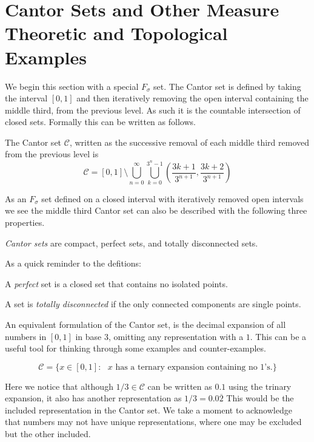 \section{Cantor Sets and Other Measure Theoretic and Topological Examples}
We begin this section with a special $F_\sigma$ set.  The Cantor set is defined by taking the interval $[0,1]$ and then iteratively removing the open interval containing the middle third, from the previous level.  As such it is the countable intersection of closed sets.  Formally this can be written as follows.
\begin{definition}
    The Cantor set $\mathcal{C}$, written as the successive removal of each middle third removed from the previous level is 
    $$\mathcal{C} = [0,1] \setminus \bigcup_{n=0}^\infty\bigcup_{k=0}^{3^n-1}\left(\frac{3k+1}{3^{n+1}},\frac{3k+2}{3^{n+1}}\right)$$
\end{definition}

As an $F_\sigma$ set defined on a closed interval with iteratively removed open intervals we see the middle third Cantor set can also be described with the following three properties.
\begin{definition}
    \textit{Cantor sets} are compact, perfect sets, and totally disconnected sets.      
\end{definition}

As a quick reminder to the defitions:
\begin{definition}[Perfect]
    A \textit{perfect} set is a closed set that contains no isolated points.
\end{definition}
\begin{definition}
    A set is \textit{totally disconnected} if the only connected components are single points. 
\end{definition}


An equivalent formulation of the Cantor set, is the decimal expansion of all numbers in $[0,1]$ in base $3$, omitting any representation with a $1$. This can be a useful tool for thinking through some examples and counter-examples.
\begin{example}
    $$\mathcal{C}  = \{ x \in [0,1]: \text{ $x$ has a ternary expansion containing no $1$'s.}\}$$
\end{example}
Here we notice that although $1/3 \in \mathcal{C} $ can be written as $0.1$ using the trinary expansion, it also has another representation as $1/3 = 0.0\overline{2}$  This would be the included representation in the Cantor set.  We take a moment to acknowledge that numbers may not have unique representations, where one may be excluded but the other included.  


